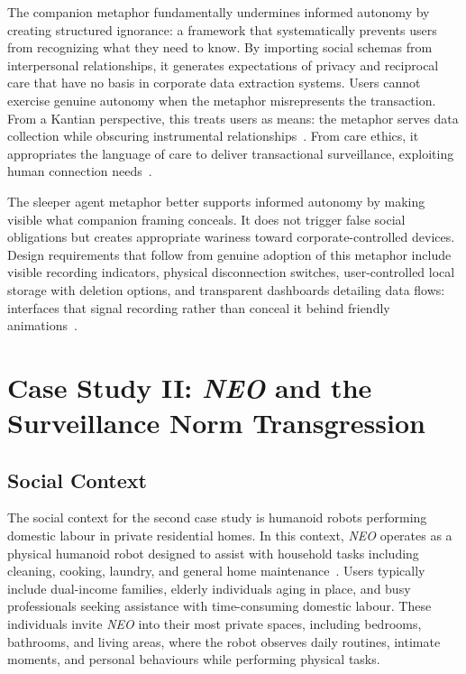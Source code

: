 \documentclass[11pt,showkeys]{../../shared/essay}
\newcommand{\neo}{\textit{NEO}}
\begin{document}
The companion metaphor fundamentally undermines informed autonomy by creating structured ignorance: a framework that systematically prevents users from recognizing what they need to know. By importing social schemas from interpersonal relationships, it generates expectations of privacy and reciprocal care that have no basis in corporate data extraction systems. Users cannot exercise genuine autonomy when the metaphor misrepresents the transaction. From a Kantian perspective, this treats users as means: the metaphor serves data collection while obscuring instrumental relationships~\cite{fjeld_principled_2020}. From care ethics, it appropriates the language of care to deliver transactional surveillance, exploiting human connection needs~\cite{noddings_caring_1986}.

The sleeper agent metaphor better supports informed autonomy by making visible what companion framing conceals. It does not trigger false social obligations but creates appropriate wariness toward corporate-controlled devices. Design requirements that follow from genuine adoption of this metaphor include visible recording indicators, physical disconnection switches, user-controlled local storage with deletion options, and transparent dashboards detailing data flows: interfaces that signal recording rather than conceal it behind friendly animations~\cite{gray_dark_2018}.

\section{Case Study II: \neo{} and the Surveillance Norm Transgression}
\label{sec:neo}

\subsection{Social Context}

The social context for the second case study is humanoid robots performing domestic labour in private residential homes. In this context, \neo{} operates as a physical humanoid robot designed to assist with household tasks including cleaning, cooking, laundry, and general home maintenance~\cite{bornich_meet_2025}. Users typically include dual-income families, elderly individuals aging in place, and busy professionals seeking assistance with time-consuming domestic labour. These individuals invite \neo{} into their most private spaces, including bedrooms, bathrooms, and living areas, where the robot observes daily routines, intimate moments, and personal behaviours while performing physical tasks.
\end{document}
